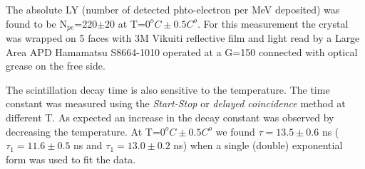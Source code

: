 The absolute LY (number of detected phto-electron per MeV deposited) was found to be N$_{pe}$=220$\pm$20 at T=$0^o C\pm 0.5C^o$. For this measurement  the crystal was wrapped on 5 faces with 3M Vikuiti reflective film \cite{vm2000} and light read by a Large Area APD Hamamatsu S8664-1010 operated at a G=150 connected with optical grease on the free side. 

The scintillation decay time is also sensitive to the temperature. The time constant was measured using the {\it Start-Stop} or {\it delayed coincidence} method at different T. As expected an increase in the decay constant was observed by decreasing the temperature. At T=$0^oC\pm 0.5C^o$ we found $\tau=13.5\pm 0.6$ ns ($\tau_1=11.6\pm 0.5$ ns and $\tau_1=13.0\pm 0.2$ ns) when a single (double) exponential form was used to fit the data.



